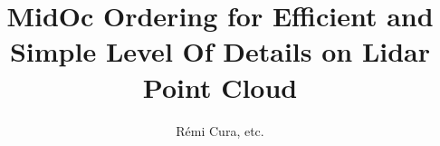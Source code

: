 
	

\title{ MidOc Ordering for Efficient and Simple Level Of Details on Lidar Point Cloud}
\author{R\'emi Cura, etc.}



\maketitle
\tableofcontents
\newpage


	
	\newpage

	
	\newpage

	
	\newpage
	
	
	\newpage

%	
	\newpage
 
%	
	\newpage

	
	\newpage

%	
%


%	
%		
%
%	 	
%		





